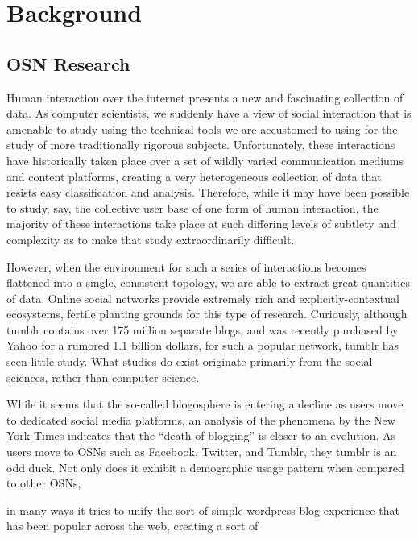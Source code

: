 \section{Background}
\label{sec:-back}
\subsection{OSN Research}


Human interaction over the internet presents a new and fascinating 
collection of data\cite{werry1996internet}.  As computer scientists, 
we suddenly have a view of social interaction that is amenable to study 
using the technical tools we are accustomed to using for the study of 
more traditionally rigorous subjects.  Unfortunately, these interactions 
have historically taken place over a set of wildly varied communication 
mediums and content platforms, creating a very heterogeneous collection 
of data that resists easy classification and analysis.  Therefore, while 
it may have been possible to study, say, the collective user base of one 
form of human interaction\cite{reid1991electropolis}, the majority of 
these interactions take place at such differing levels of subtlety and 
complexity as to make that study extraordinarily difficult.

However, when the environment for such a series of interactions becomes 
flattened into a single, consistent topology, we are able to extract 
great quantities of data.  Online social networks provide extremely 
rich and explicitly-contextual ecosystems, fertile planting grounds for 
this type of research.  Curiously, although tumblr contains over 175 
million separate blogs\cite{tumblr:about}, and was recently purchased by Yahoo for a 
rumored 1.1 billion dollars\cite{bbc-business},  
for such a popular network, tumblr has seen little study.  What studies 
do exist originate primarily from the social sciences, rather than computer 
science. 


 



While it seems that the so-called blogosphere is entering a decline 
as users move to dedicated social media platforms, an analysis of the 
phenomena by the New York Times\cite{kopytoff2011blogs} indicates that 
the ``death of blogging'' is closer to an evolution.  As users move to 
OSNs such as Facebook, Twitter, and Tumblr, they
tumblr is an odd duck.  Not only does it exhibit a demographic usage 
pattern when compared to other OSNs,

 in many ways it tries to unify 
the sort of simple wordpress blog experience that has been popular 
across the web, creating a sort of 



